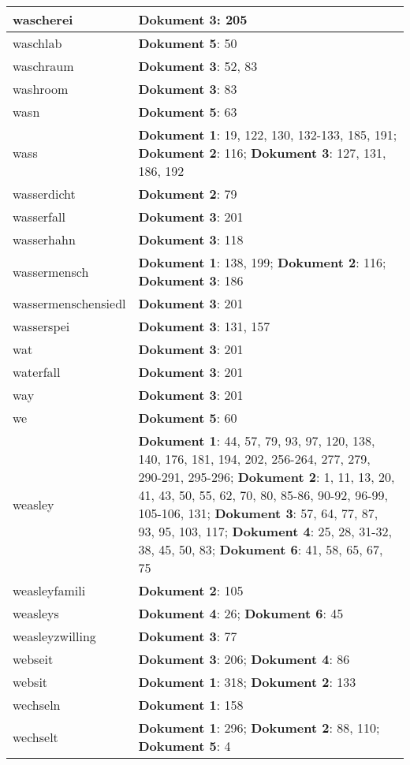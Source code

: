 \documentclass[a5paper]{article}
\begin{document}
\begin{longtable}[l]{|l|p{3in}|}
\hline
wascherei & \textbf{Dokument 3}: 205 \\
\hline
waschlab & \textbf{Dokument 5}: 50 \\
\hline
waschraum & \textbf{Dokument 3}: 52, 83 \\
\hline
washroom & \textbf{Dokument 3}: 83 \\
\hline
wasn & \textbf{Dokument 5}: 63 \\
\hline
wass & \textbf{Dokument 1}: 19, 122, 130, 132-133, 185, 191; \textbf{Dokument 2}: 116; \textbf{Dokument 3}: 127, 131, 186, 192 \\
\hline
wasserdicht & \textbf{Dokument 2}: 79 \\
\hline
wasserfall & \textbf{Dokument 3}: 201 \\
\hline
wasserhahn & \textbf{Dokument 3}: 118 \\
\hline
wassermensch & \textbf{Dokument 1}: 138, 199; \textbf{Dokument 2}: 116; \textbf{Dokument 3}: 186 \\
\hline
wassermenschensiedl & \textbf{Dokument 3}: 201 \\
\hline
wasserspei & \textbf{Dokument 3}: 131, 157 \\
\hline
wat & \textbf{Dokument 3}: 201 \\
\hline
waterfall & \textbf{Dokument 3}: 201 \\
\hline
way & \textbf{Dokument 3}: 201 \\
\hline
we & \textbf{Dokument 5}: 60 \\
\hline
weasley & \textbf{Dokument 1}: 44, 57, 79, 93, 97, 120, 138, 140, 176, 181, 194, 202, 256-264, 277, 279, 290-291, 295-296; \textbf{Dokument 2}: 1, 11, 13, 20, 41, 43, 50, 55, 62, 70, 80, 85-86, 90-92, 96-99, 105-106, 131; \textbf{Dokument 3}: 57, 64, 77, 87, 93, 95, 103, 117; \textbf{Dokument 4}: 25, 28, 31-32, 38, 45, 50, 83; \textbf{Dokument 6}: 41, 58, 65, 67, 75 \\
\hline
weasleyfamili & \textbf{Dokument 2}: 105 \\
\hline
weasleys & \textbf{Dokument 4}: 26; \textbf{Dokument 6}: 45 \\
\hline
weasleyzwilling & \textbf{Dokument 3}: 77 \\
\hline
webseit & \textbf{Dokument 3}: 206; \textbf{Dokument 4}: 86 \\
\hline
websit & \textbf{Dokument 1}: 318; \textbf{Dokument 2}: 133 \\
\hline
wechseln & \textbf{Dokument 1}: 158 \\
\hline
wechselt & \textbf{Dokument 1}: 296; \textbf{Dokument 2}: 88, 110; \textbf{Dokument 5}: 4 \\

\end{longtable}
\end{document}
